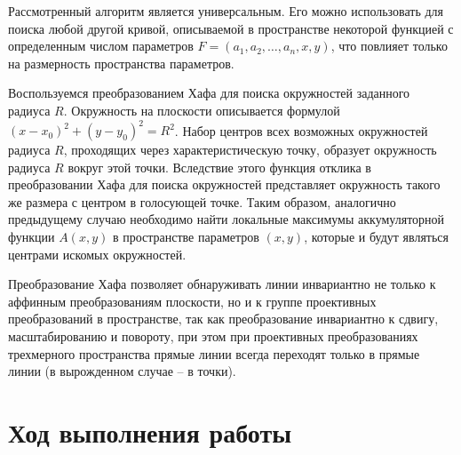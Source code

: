 \documentclass[a4paper, 16pt]{article}
\begin{document}
    \noindent Рассмотренный алгоритм является универсальным. Его можно использовать для поиска любой другой кривой, описываемой в пространстве
    некоторой функцией с определенным числом параметров $F=(a_1,a_2,\hdots ,a_n,x,y)$, что повлияет только на размерность пространства параметров.


    \noindent Воспользуемся преобразованием Хафа для поиска окружностей заданного радиуса $R$. Окружность на плоскости описывается формулой
    $(x-x_0)^2+(y-y_0)^2=R^2$. Набор центров всех возможных окружностей радиуса $R$, проходящих через характеристическую точку, образует
    окружность радиуса $R$ вокруг этой точки. Вследствие этого функция отклика в преобразовании Хафа для поиска окружностей представляет
    окружность такого же размера с центром в голосующей точке. Таким образом, аналогично предыдущему случаю необходимо найти локальные
    максимумы аккумуляторной функции $A(x,y)$ в пространстве параметров $(x,y)$, которые и будут являться центрами искомых окружностей.


    \noindent Преобразование Хафа позволяет обнаруживать линии инвариантно не только к аффинным преобразованиям плоскости, но и к группе
    проективных преобразований в пространстве, так как преобразование инвариантно к сдвигу, масштабированию и повороту, при этом при проективных
    преобразованиях трехмерного пространства прямые линии всегда переходят только в прямые линии (в вырожденном случае -- в точки).


    \section{Ход выполнения работы}
\end{document}
